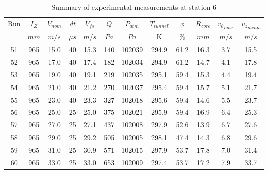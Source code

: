 \begin{table}[H]
\begin{center}
\begin{tabular}{|cccccccccccc|}
	\hline
	Run & $I_Z$ & $V_{nom}$ & $dt$ & $V_{fs}$ & $Q$ & $P_{atm}$ & $T_{tunnel}$ & $\phi$ & $R_{core}$ & $\overline{v_{\theta}}_{max}$ & $\overline{v_{z}}_{mean}$\\
	  & $mm$ & $m/s$ & $\mu s$ & $m/s$ & $Pa$ & $Pa$ & K & $\%$ & $mm$ & $m/s$ & $m/s$\\
	\hline
	51 & 965 & 15.0 & 40 & 15.3 & 140 & 102039 & 294.9 & 61.2 & 16.3 & 3.7 & 15.5\\
	52 & 965 & 17.0 & 40 & 17.4 & 182 & 102034 & 294.9 & 61.2 & 14.7 & 4.1 & 17.8\\
	53 & 965 & 19.0 & 40 & 19.1 & 219 & 102035 & 295.1 & 59.4 & 15.3 & 4.4 & 19.4\\
	54 & 965 & 21.0 & 40 & 21.2 & 270 & 102037 & 295.4 & 59.4 & 15.7 & 5.1 & 21.7\\
	55 & 965 & 23.0 & 40 & 23.3 & 327 & 102018 & 295.6 & 59.4 & 14.6 & 5.5 & 23.7\\
	56 & 965 & 25.0 & 25 & 25.0 & 375 & 102021 & 295.9 & 59.4 & 16.9 & 6.4 & 25.3\\
	57 & 965 & 27.0 & 25 & 27.1 & 437 & 102008 & 297.9 & 52.6 & 13.9 & 6.7 & 27.6\\
	58 & 965 & 29.0 & 25 & 29.2 & 505 & 102005 & 298.1 & 47.4 & 14.3 & 6.8 & 29.6\\
	59 & 965 & 31.0 & 25 & 30.9 & 571 & 102015 & 297.9 & 53.7 & 17.8 & 7.0 & 31.4\\
	60 & 965 & 33.0 & 25 & 33.0 & 653 & 102009 & 297.4 & 53.7 & 17.2 & 7.9 & 33.7\\
	\hline
\end{tabular}
\caption{Summary of experimental measurements at station 6}
\label{table:experiment_results_6}
\end{center}
\end{table}
